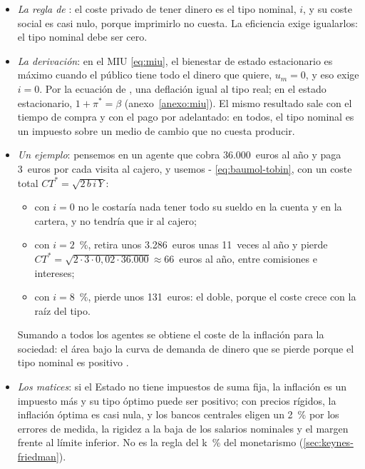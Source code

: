 \documentclass[11pt]{article}
\begin{document}
\begin{itemize}
\item \emph{La regla de }\nocite{Friedman1969Optimum}: el coste privado de tener dinero es el tipo nominal, $i$, y su coste social es casi nulo, porque imprimirlo no cuesta. La eficiencia exige igualarlos: el tipo nominal debe ser cero.
\item \emph{La derivación}: en el MIU \eqref{eq:miu}, el bienestar de estado estacionario es máximo cuando el público tiene todo el dinero que quiere, $u_m=0$, y eso exige $i=0$. Por la ecuación de ,
  una deflación igual al tipo real; en el estado estacionario, $1+\pi^*=\beta$ (anexo~\ref{anexo:miu}). El mismo resultado sale con el tiempo de compra y con el pago por adelantado: en todos, el tipo nominal es un impuesto sobre un medio de cambio que no cuesta producir.
\item \emph{Un ejemplo}: pensemos en un agente que cobra 36.000~euros al año y paga 3~euros por cada visita al cajero, y usemos - \eqref{eq:baumol-tobin}, con un coste total $CT^*=\sqrt{2\,b\,i\,Y}$:
  \begin{itemize}
  \item con $i=0$ no le costaría nada tener todo su sueldo en la cuenta y en la cartera, y no tendría que ir al cajero;
  \item con $i=2$~\%, retira unos 3.286~euros unas 11~veces al año y pierde $CT^*=\sqrt{2\cdot 3\cdot 0{,}02\cdot 36.000}\approx 66$~euros al año, entre comisiones e intereses;
  \item con $i=8$~\%, pierde unos 131~euros: el doble, porque el coste crece con la raíz del tipo.
  \end{itemize}
  Sumando a todos los agentes se obtiene el coste de la inflación para la sociedad: el área bajo la curva de demanda de dinero que se pierde porque el tipo nominal es positivo\nocite{Bailey1956Welfare,Lucas2000Inflation} .
\item \emph{Los matices}: si el Estado no tiene impuestos de suma fija, la inflación es un impuesto más y su tipo óptimo puede ser positivo\nocite{Phelps1973Inflation}; con precios rígidos, la inflación óptima es casi nula, y los bancos centrales eligen un 2~\% por los errores de medida, la rigidez a la baja de los salarios nominales y el margen frente al límite inferior\nocite{SchmittGroheUribe2010Optimal}. No es la regla del k~\% del monetarismo (\ref{sec:keynes-friedman}).
\end{itemize}
\end{document}
